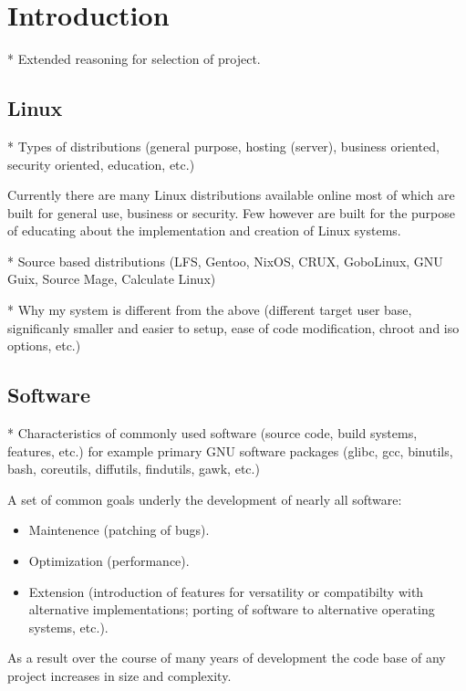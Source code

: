\section{Introduction}\label{Introduction}

* Extended reasoning for selection of project.


\subsection{Linux}

* Types of distributions (general purpose, hosting (server), business oriented, security oriented, education, etc.)

Currently there are many Linux distributions available online most of which are built for general use, business or security. Few however are built for the purpose of educating about the implementation and creation of Linux systems. 

* Source based distributions (LFS, Gentoo, NixOS, CRUX, GoboLinux, GNU Guix, Source Mage, Calculate Linux)

* Why my system is different from the above (different target user base, significanly smaller and easier to setup, ease of code modification, chroot and iso options, etc.)


\subsection{Software}

* Characteristics of commonly used software (source code, build systems, features, etc.) for example primary GNU software packages (glibc, gcc, binutils, bash, coreutils, diffutils, findutils, gawk, etc.)

A set of common goals underly the development of nearly all software:

\begin{itemize}
    \item Maintenence (patching of bugs).
    \item Optimization (performance).
    \item Extension (introduction of features for versatility or compatibilty with alternative implementations; porting of software to alternative operating systems, etc.).
\end{itemize}

As a result over the course of many years of development the code base of any project increases in size and complexity.

